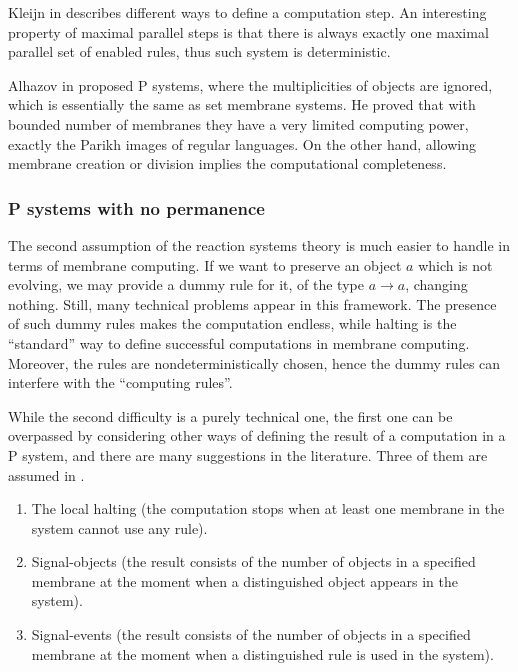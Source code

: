 Kleijn in \cite{Kleijn11SetMembrane} describes different ways to define a computation step. An interesting property of maximal parallel steps is that there is always exactly one maximal parallel set of enabled rules, thus such system is deterministic.

Alhazov in \cite{Alhazov05WithoutMultiplicities} proposed P systems, where the multiplicities of objects are ignored, which is essentially the same as set membrane systems. He proved that with bounded number of membranes they have a very limited computing power, exactly the Parikh images of regular languages. On the other hand, allowing membrane creation or division implies the computational completeness.


\subsubsection{P systems with no permanence} %
\label{ssub:p_systems_with_no_permanence}

 The second assumption of the reaction systems theory is much easier to handle in terms of membrane computing. If we want to preserve an object $a$ which is not evolving, we may provide a dummy rule for it, of the type $a\rightarrow a$, changing nothing. Still, many technical problems appear in this framework. The presence of such dummy rules makes the computation endless, while halting is the ``standard'' way to define successful computations in membrane computing. Moreover, the rules are nondeterministically chosen, hence the dummy rules can interfere with the ``computing rules''.

While the second difficulty is a purely technical one, the first one can be overpassed by considering other ways of defining the result of a computation in a P system, and there are many suggestions in the literature. Three of them are assumed in \cite{Paun12BridgingReactionSystems}.
\begin{enumerate}
  \item The local halting (the computation stops when at least one membrane in the system cannot use any rule).
  \item Signal-objects (the result consists of the number of objects in a specified membrane at the moment when a distinguished object appears in the system).
  \item Signal-events (the result consists of the number of objects in a specified membrane at the moment when a distinguished rule is used in the system).
\end{enumerate}

